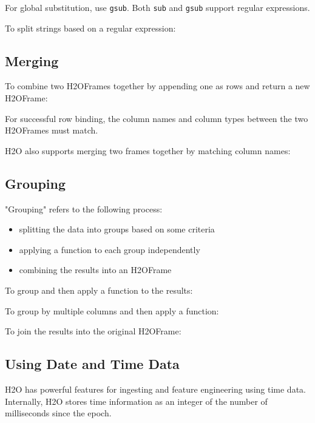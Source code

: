 {For global substitution, use {\texttt{gsub}}.  Both {\texttt{sub}} and {\texttt{gsub}} support regular expressions.

\newpage
To split strings based on a regular expression:



\subsection{Merging}
To combine two H2OFrames together by appending one as rows and return a new H2OFrame:


For successful row binding, the column names and column types between the two H2OFrames must match.

H2O also supports merging two frames together by matching column names:


\subsection{Grouping}

"Grouping" refers to the following process:

\begin{itemize}
\item splitting the data into groups based on some criteria 
\item applying a function to each group independently
\item combining the results into an H2OFrame
\end{itemize}

To group and then apply a function to the results:


To group by multiple columns and then apply a function:


To join the results into the original H2OFrame:


\newpage
\subsection{Using Date and Time Data} 
H2O has powerful features for ingesting and feature engineering using time data.  Internally, H2O
stores time information as an integer of the number of milliseconds since the epoch.

}
